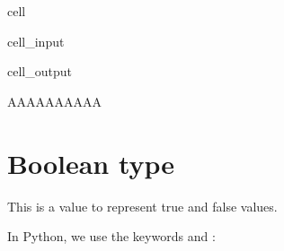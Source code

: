 \documentclass[letterpaper,10pt,english]{jupyterBook}
\begin{document}
\begin{sphinxuseclass}{cell}\begin{sphinxVerbatimInput}

\begin{sphinxuseclass}{cell_input}
\begin{sphinxVerbatim}[commandchars=\\\{\}]
  
\end{sphinxVerbatim}

\end{sphinxuseclass}\end{sphinxVerbatimInput}
\begin{sphinxVerbatimOutput}

\begin{sphinxuseclass}{cell_output}
\begin{sphinxVerbatim}[commandchars=\\\{\}]
\PYGZsq{}AAAAAAAAAA\PYGZsq{}
\end{sphinxVerbatim}

\end{sphinxuseclass}\end{sphinxVerbatimOutput}

\end{sphinxuseclass}

\section{Boolean type}
\label{\detokenize{datatypes:boolean-type}}
\sphinxAtStartPar
This is a value to represent true and false values.

\sphinxAtStartPar
In Python, we use the keywords  and :
\end{document}
